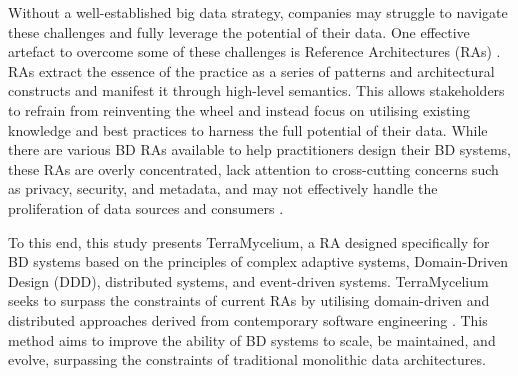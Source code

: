 \documentclass[preprint,12pt]{elsarticle}
\begin{document}
Without a well-established big data strategy, companies may struggle to navigate these challenges and fully leverage the potential of their data. One effective artefact to overcome some of these challenges is Reference Architectures (RAs) \cite{Cloutier2010}. RAs extract the essence of the practice as a series of patterns and architectural constructs and manifest it through high-level semantics. This allows stakeholders to refrain from reinventing the wheel and instead focus on utilising existing knowledge and best practices to harness the full potential of their data. While there are various BD RAs available to help practitioners design their BD systems, these RAs are overly concentrated, lack attention to cross-cutting concerns such as privacy, security, and metadata, and may not effectively handle the proliferation of data sources and consumers \cite{ataei2022state,AtaeiACIS}.

To this end, this study presents TerraMycelium, a RA designed specifically for BD systems based on the principles of complex adaptive systems, Domain-Driven Design (DDD), distributed systems, and event-driven systems. TerraMycelium seeks to surpass the constraints of current RAs by utilising domain-driven and distributed approaches derived from contemporary software engineering \cite{ataei2023application}. This method aims to improve the ability of BD systems to scale, be maintained, and evolve, surpassing the constraints of traditional monolithic data architectures. 

\end{document}
